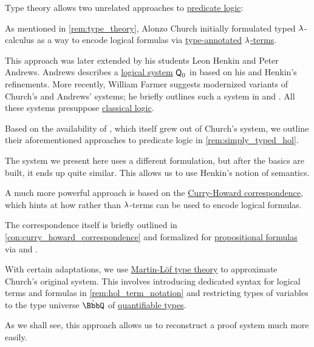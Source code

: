 \begin{remark}\label{rem:higher_order_logic_and_type_theory}
  Type theory allows two unrelated approaches to \hyperref[rem:predicate_logic]{predicate logic}:
  \begin{thmenum}
     As mentioned in \cref{rem:type_theory}, Alonzo Church initially formulated typed \( {\mathrm \lambda} \)-calculus as a way to encode logical formulas via \hyperref[con:type_annotation]{type-annotated} \hyperref[def:lambda_term]{\( {\mathrm \lambda} \)-terms}.

    This approach was later extended by his students Leon Henkin and Peter Andrews. Andrews describes a \hyperref[con:logical_system]{logical system} \( \textsf{\upshape Q}_0 \) in \cite[ch. 5]{Andrews2002Logic} based on his and Henkin's refinements. More recently, William Farmer suggests modernized variants of Church's and Andrews' systems; he briefly outlines such a system in \cite{Farmer2008STTVirtues} and \cite{Farmer1990PartialFunctionSTT}. All these systems presuppose \hyperref[con:classical_logic]{classical logic}.

    Based on the availability of , which itself grew out of Church's system, we outline their aforementioned approaches to predicate logic in \cref{rem:simply_typed_hol}.

    The system we present here uses a different formulation, but after the basics are built, it ends up quite similar. This allows us to use Henkin's notion of semantics.

     A much more powerful approach is based on the \hyperref[con:curry_howard_correspondence]{Curry-Howard correspondence}, which hints at how  rather than \( {\mathrm \lambda} \)-terms can be used to encode logical formulas.

    The correspondence itself is briefly outlined in \cref{con:curry_howard_correspondence} and formalized for \hyperref[def:propositional_syntax/formula]{propositional formulas} via  and .

    With certain adaptations, we use \hyperref[def:martin_lof_type_theory]{Martin-L\"of type theory} to approximate Church's original system. This involves introducing dedicated syntax for logical terms and formulas in \cref{rem:hol_term_notation} and restricting types of variables to the type universe \( \syn\BbbQ \) of \hyperref[def:hol_signature/universes/quant]{quantifiable types}.

    As we shall see, this approach allows us to reconstruct a proof system much more easily.
  \end{thmenum}
\end{remark}

